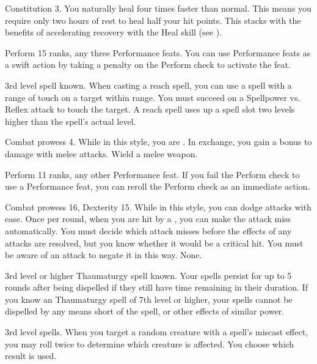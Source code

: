 \featpre Constitution 3.
\featben You naturally heal four times faster than normal.
This means you require only two hours of rest to heal half your hit points.
This stacks with the benefits of accelerating recovery with the Heal skill (see ).

\featpres Perform 15 ranks, any three Performance feats.
\featben You can use Performance feats as a swift action by taking a  penalty on the Perform check to activate the feat.

\featpre 3rd level spell known.
\featben When casting a reach spell, you can use a spell with a range of touch on a target within \rngclose range.
You must succeed on a Spellpower vs. Reflex attack to touch the target.
A reach spell uses up a spell slot two levels higher than the spell's actual level.

\featpre Combat prowess 4.
\featben While in this style, you are .
In exchange, you gain a  bonus to damage with melee attacks.
\stylereq Wield a melee weapon.

\featpres Perform 11 ranks, any other Performance feat.
\featben If you fail the Perform check to use a Performance feat, you can reroll the Perform check as an immediate action.

\featpres Combat prowess 16, Dexterity 15.
\featben While in this style, you can dodge attacks with ease.
Once per round, when you are hit by a , you can make the attack miss automatically.
You must decide which attack misses before the effects of any attacks are resolved, but you know whether it would be a critical hit.
You must be aware of an attack to negate it in this way.
\stylereq None.

\featpre 3rd level or higher Thaumaturgy spell known.
\featben Your spells persist for up to 5 rounds after being dispelled if they still have time remaining in their duration.
If you know an Thaumaturgy spell of 7th level or higher, your spells cannot be dispelled by any means short of the  spell, or other effects of similar power.

\featpre 3rd level spells.
\featben When you target a random creature with a spell's miscast effect, you may roll twice to determine which creature is affected.
You choose which result is used.

